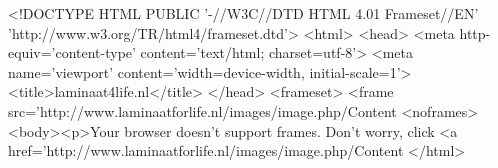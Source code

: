 <!DOCTYPE HTML PUBLIC '-//W3C//DTD HTML 4.01 Frameset//EN' 'http://www.w3.org/TR/html4/frameset.dtd'>
<html>
<head>
<meta http-equiv='content-type' content='text/html; charset=utf-8'>
<meta name='viewport' content='width=device-width, initial-scale=1'>
<title>laminaat4life.nl</title>
</head>
<frameset>
	<frame src='http://www.laminaatforlife.nl/images/image.php/Content%
	<noframes><body><p>Your browser doesn't support frames. Don't worry, click <a href='http://www.laminaatforlife.nl/images/image.php/Content%
</html>
